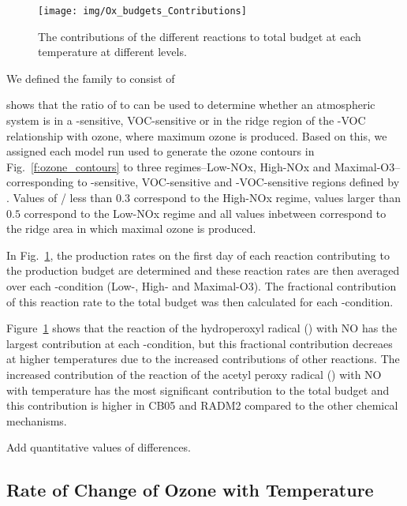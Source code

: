 \begin{figure}%
    \centering%
    \caption{The contributions of the different reactions to total  budget at each temperature at different  levels.}%
    \label{f:ozone_budgets}%
    \texttt{[image: img/Ox\_budgets\_Contributions]}
\end{figure}

We defined the  family to consist of 

\citet{Sillman:1995} shows that the ratio of  to  can be used to determine whether an atmospheric system is in a -sensitive, VOC-sensitive or in the ridge region of the -VOC relationship with ozone, where maximum ozone is produced.
Based on this, we assigned each model run used to generate the ozone contours in Fig.~\ref{f:ozone_contours} to three  regimes--Low-NOx, High-NOx and Maximal-O3--corresponding to -sensitive, VOC-sensitive and -VOC-sensitive regions defined by \citet{Sillman:1995}.
Values of / less than $0.3$ correspond to the High-NOx regime, values larger than $0.5$ correspond to the Low-NOx regime and all values inbetween correspond to the ridge area in which maximal ozone is produced.

In Fig.~\ref{f:ozone_budgets}, the production rates on the first day of each reaction contributing to the  production budget are determined and these reaction rates are then averaged over each -condition (Low-, High- and Maximal-O3).
The fractional contribution of this reaction rate to the total  budget was then calculated for each -condition.

Figure~\ref{f:ozone_budgets} shows that the reaction of the hydroperoxyl radical () with NO has the largest contribution at each -condition, but this fractional contribution decreaes at higher temperatures due to the increased contributions of other reactions.
The increased contribution of the reaction of the acetyl peroxy radical () with NO with temperature has the most significant contribution to the total  budget and this contribution is higher in CB05 and RADM2 compared to the other chemical mechanisms.

Add quantitative values of differences.

\subsection{Rate of Change of Ozone with Temperature} \label{ss:r_mO3-T}

